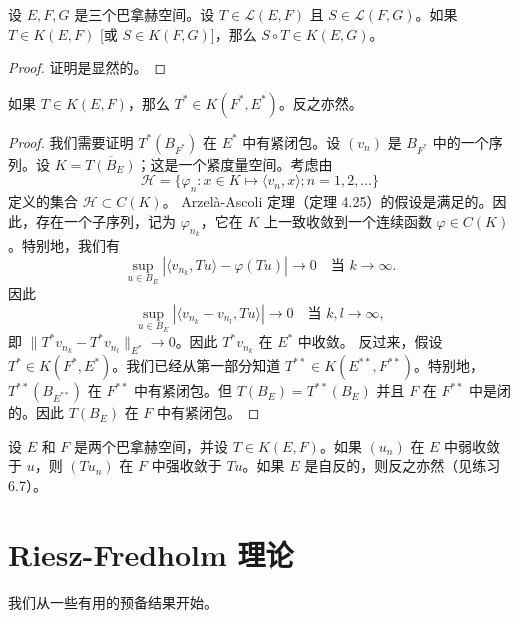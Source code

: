 \begin{proposition}\label{proposition:6.3}
设 \(E, F, G\) 是三个巴拿赫空间。设 \(T \in \mathcal{L}(E, F)\) 且 \(S \in \mathcal{L}(F, G)\)。如果 \(T \in K(E, F)\) [或 \(S \in K(F, G)\)]，那么 \(S \circ T \in K(E, G)\)。
\end{proposition}
\begin{proof}
证明是显然的。
\end{proof}

\begin{theorem}[Schauder]\label{theorem:6.4}
如果 \(T \in K(E, F)\)，那么 \(T^* \in K(F^*, E^*)\)。反之亦然。
\end{theorem}
\begin{proof}
我们需要证明 \(T^*(B_{F^*})\) 在 \(E^*\) 中有紧闭包。设 \((v_n)\) 是 \(B_{F^*}\) 中的一个序列。设 \(K = \overline{T(B_E)}\)；这是一个紧度量空间。考虑由
\[
\mathcal{H} = \{\varphi_n: x \in K \mapsto \langle v_n, x \rangle; n=1, 2, \ldots\}
\]
定义的集合 \(\mathcal{H} \subset C(K)\)。
Arzelà-Ascoli 定理（定理 4.25）的假设是满足的。因此，存在一个子序列，记为 \(\varphi_{n_k}\)，它在 \(K\) 上一致收敛到一个连续函数 \(\varphi \in C(K)\)。特别地，我们有
\[
\sup_{u \in B_E} |\langle v_{n_k}, Tu \rangle - \varphi(Tu)| \to 0 \quad \text{当 } k \to \infty.
\]
因此
\[
\sup_{u \in B_E} |\langle v_{n_k} - v_{n_l}, Tu \rangle| \to 0 \quad \text{当 } k,l \to \infty,
\]
即 \(\|T^*v_{n_k} - T^*v_{n_l}\|_{E^*} \to 0\)。因此 \(T^*v_{n_k}\) 在 \(E^*\) 中收敛。
反过来，假设 \(T^* \in K(F^*, E^*)\)。我们已经从第一部分知道 \(T^{**} \in K(E^{**}, F^{**})\)。特别地，\(T^{**}(B_{E^{**}})\) 在 \(F^{**}\) 中有紧闭包。但 \(T(B_E) = T^{**}(B_E)\) 并且 \(F\) 在 \(F^{**}\) 中是闭的。因此 \(T(B_E)\) 在 \(F\) 中有紧闭包。
\end{proof}

\begin{remark}\label{remark:6.2}
设 \(E\) 和 \(F\) 是两个巴拿赫空间，并设 \(T \in K(E, F)\)。如果 \((u_n)\) 在 \(E\) 中弱收敛于 \(u\)，则 \((Tu_n)\) 在 \(F\) 中强收敛于 \(Tu\)。如果 \(E\) 是自反的，则反之亦然（见练习 6.7）。
\end{remark}

\section{Riesz-Fredholm 理论}

我们从一些有用的预备结果开始。

